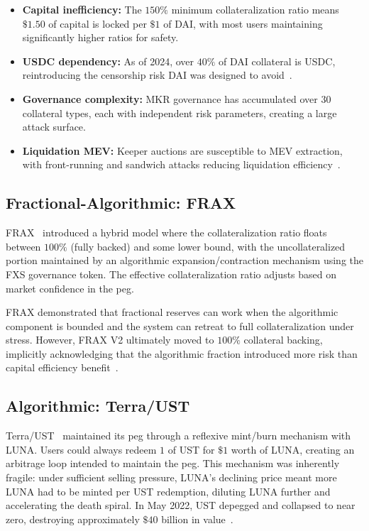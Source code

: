 \documentclass[11pt,a4paper]{article}
\begin{document}
\begin{itemize}
  \item \textbf{Capital inefficiency:} The $150\%$ minimum collateralization ratio means $\$1.50$ of capital is locked per $\$1$ of DAI, with most users maintaining significantly higher ratios for safety.
  \item \textbf{USDC dependency:} As of 2024, over $40\%$ of DAI collateral is USDC, reintroducing the censorship risk DAI was designed to avoid~\citep{daistats2024}.
  \item \textbf{Governance complexity:} MKR governance has accumulated over $30$ collateral types, each with independent risk parameters, creating a large attack surface.
  \item \textbf{Liquidation MEV:} Keeper auctions are susceptible to MEV extraction, with front-running and sandwich attacks reducing liquidation efficiency~\citep{qin2022}.
\end{itemize}

\subsection{Fractional-Algorithmic: FRAX}

FRAX~\citep{frax2021} introduced a hybrid model where the collateralization ratio floats between $100\%$ (fully backed) and some lower bound, with the uncollateralized portion maintained by an algorithmic expansion/contraction mechanism using the FXS governance token.
The effective collateralization ratio adjusts based on market confidence in the peg.

FRAX demonstrated that fractional reserves can work when the algorithmic component is bounded and the system can retreat to full collateralization under stress.
However, FRAX V2 ultimately moved to $100\%$ collateral backing, implicitly acknowledging that the algorithmic fraction introduced more risk than capital efficiency benefit~\citep{fraxv2}.

\subsection{Algorithmic: Terra/UST}

Terra/UST~\citep{terra2022} maintained its peg through a reflexive mint/burn mechanism with LUNA.
Users could always redeem $1$ of UST for $\$1$ worth of LUNA, creating an arbitrage loop intended to maintain the peg.
This mechanism was inherently fragile: under sufficient selling pressure, LUNA's declining price meant more LUNA had to be minted per UST redemption, diluting LUNA further and accelerating the death spiral.
In May 2022, UST depegged and collapsed to near zero, destroying approximately $\$40$ billion in value~\citep{liu2023}.
\end{document}
